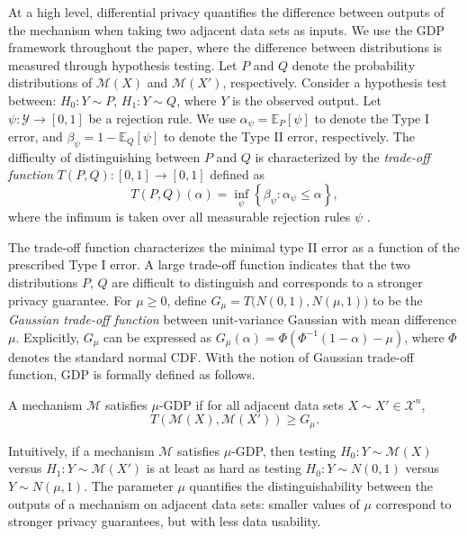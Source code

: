 \documentclass[twoside,11pt]{article}
\begin{document}
At a high level, differential privacy quantifies the difference between outputs of the mechanism when taking two adjacent data sets as inputs. We use the GDP framework throughout the paper, where the difference between distributions is measured through hypothesis testing. Let $P$ and $Q$ denote the probability distributions of $\mathcal{M}(X)$ and $\mathcal{M}(X')$, respectively. Consider a hypothesis test between: $H_0: Y\sim P$, $H_1: Y\sim Q$, where $Y$ is the observed output. Let $\psi:\mathcal{Y}\to [0,1]$ be a rejection rule. We use $\alpha_\psi = \mathbb{E}_P[\psi]$ to denote the Type I error, and $\beta_\psi = 1-\mathbb{E}_Q[\psi]$ to denote the Type II error, respectively. The difficulty of distinguishing between $P$ and $Q$ is characterized by the \emph{trade-off function} $T(P, Q):[0, 1] \to [0, 1]$ defined as
\[
T(P,Q)(\alpha)=\inf_{\psi}
\left\{
\beta_\psi:\alpha_\psi\le \alpha
\right\},
\]
where the infimum is taken over all measurable rejection rules $\psi$ \citep{dong2022gaussian}.

The trade-off function characterizes the minimal type II error as a function of the prescribed Type I error. A large trade-off function indicates that the two distributions $P,\,Q$ are difficult to distinguish and corresponds to a stronger privacy guarantee. For $\mu\ge 0$, define $G_\mu = T\bigl(N(0,1),N(\mu,1)\bigr)$ to be the \emph{Gaussian trade-off function} between unit-variance Gaussian with mean difference $\mu$. Explicitly, $G_\mu$ can be expressed as $G_\mu(\alpha) = \Phi(\Phi^{-1}(1-\alpha)-\mu)$, where $\Phi$ denotes the standard normal CDF. With the notion of Gaussian trade-off function, GDP is formally defined as follows.

\begin{definition}
\label{def: mu-GDP}
A mechanism $\mathcal{M}$ satisfies $\mu$-GDP if for all adjacent data sets $X \sim X' \in \mathcal{X}^n$,
\[
T(\mathcal{M}(X),\mathcal{M}(X')) \ge G_\mu.
\]
\end{definition}

Intuitively, if a mechanism $\mathcal{M}$ satisfies $\mu$-GDP, then testing $H_0: Y\sim \mathcal{M}(X)$ versus $H_1: Y\sim \mathcal{M}(X')$ is at least as hard as testing $H_0: Y\sim N(0,1)$ versus $Y\sim N(\mu, 1)$. The parameter $\mu$ quantifies the distinguishability between the outputs of a mechanism on adjacent data sets: smaller values of $\mu$ correspond to stronger privacy guarantees, but with less data usability. 
\end{document}
